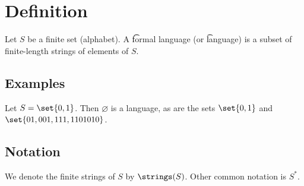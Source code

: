
\section*{Definition}

Let $S$ be a finite set (alphabet).
A \t{formal language} (or \t{language}) is a subset of finite-length strings of elements of $S$.

\subsection*{Examples}

Let $S = \set{0,1}$.
Then $\varnothing$ is a language, as are the sets $\set{0, 1}$ and $\set{01, 001, 111, 1101010}$.

\subsection*{Notation}

We denote the finite strings of $S$ by $\strings(S)$.
Other common notation is $S^*$.

\blankpage